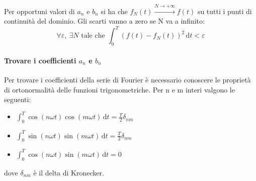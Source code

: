 Per opportuni valori di \(a_n\) e \(b_n\) si ha che \(f_N(t)\xrightarrow{N \to +\infty }f(t)\) su tutti i punti di continuità del dominio. Gli scarti vanno a zero se N va a infinito:
\[
	\forall \varepsilon,\ \exists N \text{ tale che } \int_{0}^{T} (f(t) - f_N(t))^{2}  \,\mathrm{d}t < \varepsilon 
\]

\paragraph{Trovare i coefficienti \(a_n\) e \(b_n\)} Per trovare i coefficienti della serie di Fourier è necessario conoscere le proprietà di ortonormalità delle funzioni trigonometriche. Per n e m interi valgono le seguenti:
\begin{itemize}
	
	\item \(\int_{0}^{T} \cos (n \omega t) \cos (m \omega t) \,\mathrm{d}t = \frac{T}{2} \delta_{nm}  \) 
	\item \(\int_{0}^{T} \sin (n \omega t) \sin (m \omega t) \,\mathrm{d}t = \frac{T}{2} \delta_{nm}  \)
	\item \(\int_{0}^{T} \cos (n \omega t) \sin (m \omega t) \,\mathrm{d}t = 0 \)  
\end{itemize}
dove \(\delta_{nm} \) è il delta di Kronecker.